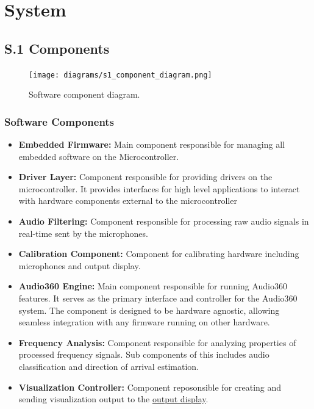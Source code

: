 \documentclass[12pt]{article}
\theoremstyle{definition}
\begin{document}
\section{System}

\subsection{S.1 Components}

\begin{figure}[H]     
    \centering 
    \texttt{[image: diagrams/s1\_component\_diagram.png]}
    \caption{Software component diagram.}
    \label{fig:software_component_diagram}
\end{figure}

\subsubsection{Software Components}

\begin{itemize}
  \item \textbf{Embedded Firmware:} \label{comp:embedded_firmware} Main
  component responsible for managing all embedded software on the
  Microcontroller.

  \item \textbf{Driver Layer:} \label{comp:driver_layer} Component responsible
  for providing drivers on the microcontroller. It provides interfaces for high
  level applications to interact with hardware components external to the
  microcontroller

  \item \textbf{Audio Filtering:} \label{comp:audio_filtering} Component
  responsible for processing raw audio signals in real-time sent by the
  microphones.

  \item \textbf{Calibration Component:} \label{comp:calibration} Component for
  calibrating hardware including microphones and output display.
  
  \item \textbf{Audio360 Engine:} \label{comp:audio360Engine} Main component
  responsible for running Audio360 features. It serves as the primary interface
  and controller for the Audio360 system. The component is designed to be
  hardware agnostic, allowing seamless integration with any firmware running on
  other hardware.
  
  \item \textbf{Frequency Analysis:} \label{comp:frequency_analysis} Component
  responsible for analyzing properties of processed frequency signals. Sub
  components of this includes audio classification and direction of arrival
  estimation.
  
  \item \textbf{Visualization Controller:} \label{comp:viz_controller} Component
  reposonsible for creating and sending visualization output to the
  \hyperref[comp:display]{output display}.
\end{itemize}
\end{document}
